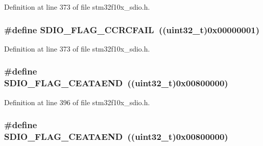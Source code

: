 Definition at line 373 of file stm32f10x\+\_\+sdio.\+h.

\subsubsection[{\texorpdfstring{S\+D\+I\+O\+\_\+\+F\+L\+A\+G\+\_\+\+C\+C\+R\+C\+F\+A\+IL}{SDIO_FLAG_CCRCFAIL}}]{\setlength{\rightskip}{0pt plus 5cm}\#define S\+D\+I\+O\+\_\+\+F\+L\+A\+G\+\_\+\+C\+C\+R\+C\+F\+A\+IL~(({\bf uint32\+\_\+t})0x00000001)}\hypertarget{group___s_d_i_o___flags_ga8ff1f3960378e05ec3c949940e1c49d0}{}\label{group___s_d_i_o___flags_ga8ff1f3960378e05ec3c949940e1c49d0}


Definition at line 373 of file stm32f10x\+\_\+sdio.\+h.

\subsubsection[{\texorpdfstring{S\+D\+I\+O\+\_\+\+F\+L\+A\+G\+\_\+\+C\+E\+A\+T\+A\+E\+ND}{SDIO_FLAG_CEATAEND}}]{\setlength{\rightskip}{0pt plus 5cm}\#define S\+D\+I\+O\+\_\+\+F\+L\+A\+G\+\_\+\+C\+E\+A\+T\+A\+E\+ND~(({\bf uint32\+\_\+t})0x00800000)}\hypertarget{group___s_d_i_o___flags_ga3c8d09a405944948e7a1c5493d49aff1}{}\label{group___s_d_i_o___flags_ga3c8d09a405944948e7a1c5493d49aff1}


Definition at line 396 of file stm32f10x\+\_\+sdio.\+h.

\subsubsection[{\texorpdfstring{S\+D\+I\+O\+\_\+\+F\+L\+A\+G\+\_\+\+C\+E\+A\+T\+A\+E\+ND}{SDIO_FLAG_CEATAEND}}]{\setlength{\rightskip}{0pt plus 5cm}\#define S\+D\+I\+O\+\_\+\+F\+L\+A\+G\+\_\+\+C\+E\+A\+T\+A\+E\+ND~(({\bf uint32\+\_\+t})0x00800000)}\hypertarget{group___s_d_i_o___flags_ga3c8d09a405944948e7a1c5493d49aff1}{}\label{group___s_d_i_o___flags_ga3c8d09a405944948e7a1c5493d49aff1}


